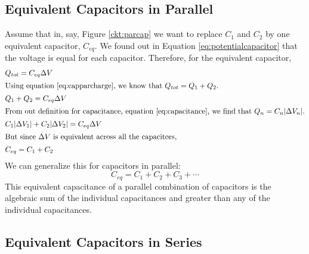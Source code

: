 \subsection{Equivalent Capacitors in Parallel}

Assume that in, say, Figure \ref{ckt:parcap} we want to replace $C_1$ and $C_2$
by one equivalent capacitor, $C_{eq}$. We found out in Equation
\ref{eq:potentialcapacitor} that the voltage is equal for each capacitor.
Therefore, for the equivalent capacitor,
\begin{align*}
  &Q_{tot}=C_{eq} \Delta V \\
  \intertext{Using equation \ref{eq:capparcharge}, we know that
  $Q_{tot}=Q_1+Q_2$.}
  &Q_1+Q_2=C_{eq} \Delta V \\
  \intertext{From out definition for capacitance, equation \ref{eq:capacitance},
we find that $Q_n = C_n | \Delta V_n |$.}
  &C_1 | \Delta V_1 | + C_2 | \Delta V_2 |  = C_{eq} \Delta V\\
  \intertext{But since $\Delta V$ is equivalent across all the capacitors,}
  &C_{eq}=C_1 + C_2
\end{align*}
We can generalize this for capacitors in parallel:
\begin{equation}
  C_{eq} = C_1 + C_2 + C_3 + \cdots
  \label{eq:eqcappar}
\end{equation}
This equivalent capacitance of a parallel combination of capacitors is the
algebraic sum of the individual capacitances and greater than any of the
individual capacitances.\cite[p.~728]{serway}

\subsection{Equivalent Capacitors in Series}

